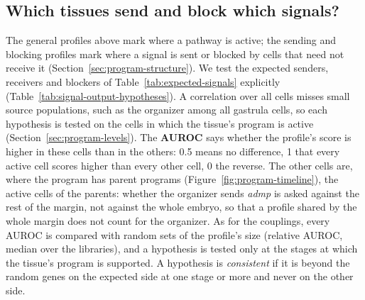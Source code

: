 \documentclass[11pt,a4paper]{article}
\begin{document}
\subsection{Which tissues send and block which signals?}
\label{sec:signal-outputs}

The general profiles above mark where a pathway is active; the sending and blocking profiles mark where a signal is sent or blocked by cells that need not receive it (Section~\ref{sec:program-structure}). We test the expected senders, receivers and blockers of Table~\ref{tab:expected-signals} explicitly (Table~\ref{tab:signal-output-hypotheses}). A correlation over all cells misses small source populations, such as the organizer among all gastrula cells, so each hypothesis is tested on the cells in which the tissue's program is active (Section~\ref{sec:program-levels}). The \textbf{AUROC} says whether the profile's score is higher in these cells than in the others: 0.5 means no difference, 1 that every active cell scores higher than every other cell, 0 the reverse. The other cells are, where the program has parent programs (Figure~\ref{fig:program-timeline}), the active cells of the parents: whether the organizer sends \emph{admp} is asked against the rest of the margin, not against the whole embryo, so that a profile shared by the whole margin does not count for the organizer. As for the couplings, every AUROC is compared with random sets of the profile's size (relative AUROC, median over the libraries), and a hypothesis is tested only at the stages at which the tissue's program is supported. A hypothesis is \emph{consistent} if it is beyond the random genes on the expected side at one stage or more and never on the other side.
\end{document}
